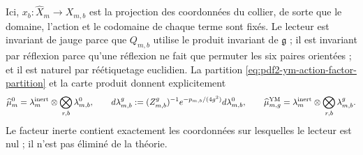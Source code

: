 Ici, $x_b:\widehat X_m\to X_{m,b}$ est la projection des coordonnées du
collier, de sorte que le domaine, l’action et le codomaine de chaque terme sont fixés.
Le lecteur est invariant de jauge parce que $Q_{m,b}$ utilise le produit invariant de
$\mathfrak g$ ; il est invariant par réflexion parce qu’une réflexion ne fait que permuter les
six paires orientées ; et il est naturel par réétiquetage euclidien.
La partition \eqref{eq:pdf2-ym-action-factor-partition} et la carte produit donnent
explicitement
\begin{equation}\label{eq:pdf2-ym-action-factor-measures}
 \widehat\mu_m^0=\lambda_m^{\rm inert}\otimes
   \bigotimes_{r,b}\lambda_{m,b}^0,
 \qquad
 d\lambda_{m,b}^g
 :=(Z_{m,b}^g)^{-1}e^{-p_{m,b}/(4g^2)}d\lambda_{m,b}^0,
 \qquad
 \widehat\mu_{m,g}^{\rm YM}=\lambda_m^{\rm inert}\otimes
   \bigotimes_{r,b}\lambda_{m,b}^g.
\end{equation}
Le facteur inerte contient exactement les coordonnées sur lesquelles le lecteur est nul ; il n'est pas éliminé de la théorie.

